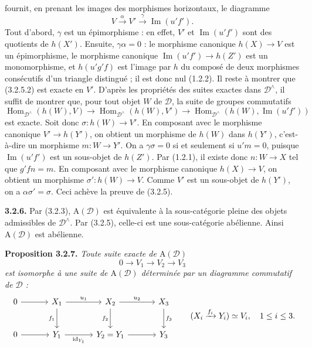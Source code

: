 \clearpage
{}%
\begingroup\small\setlength{\parskip}{0pt}\setlength{\emergencystretch}{1.5em}
fournit, en prenant les images des morphismes horizontaux, le diagramme
\[
V\xrightarrow{\alpha}V'\xrightarrow{\gamma}\operatorname{Im}(u'f').
\tag{3.2.5.2}
\]
Tout d'abord, $\gamma$ est un épimorphisme : en effet, $V'$ et
$\operatorname{Im}(u'f')$ sont des quotients de $h(X')$. Ensuite,
$\gamma\alpha=0$ : le morphisme canonique $h(X)\to V$ est un épimorphisme,
le morphisme canonique $\operatorname{Im}(u'f')\to h(Z')$ est un
monomorphisme, et $h(u'g'f)$ est l'image par $h$ du composé de deux
morphismes consécutifs d'un triangle distingué ; il est donc nul (1.2.2).
Il reste à montrer que (3.2.5.2) est exacte en $V'$. D'après les propriétés
des suites exactes dans $\mathcal D^\wedge$, il suffit de montrer que, pour
tout objet $W$ de $\mathcal D$, la suite de groupes commutatifs
\[
\operatorname{Hom}_{\mathcal D^\wedge}(h(W),V)\longrightarrow
\operatorname{Hom}_{\mathcal D^\wedge}(h(W),V')\longrightarrow
\operatorname{Hom}_{\mathcal D^\wedge}(h(W),\operatorname{Im}(u'f'))
\]
est exacte. Soit donc $\sigma\colon h(W)\to V'$. En composant avec le
morphisme canonique $V'\to h(Y')$, on obtient un morphisme de $h(W)$ dans
$h(Y')$, c'est-à-dire un morphisme $m\colon W\to Y'$. On a
$\gamma\sigma=0$ si et seulement si $u'm=0$, puisque
$\operatorname{Im}(u'f')$ est un sous-objet de $h(Z')$. Par (1.2.1), il
existe donc $n\colon W\to X$ tel que $g'fn=m$. En composant avec le morphisme
canonique $h(X)\to V$, on obtient un morphisme $\sigma'\colon h(W)\to V$.
Comme $V'$ est un sous-objet de $h(Y')$, on a $\alpha\sigma'=\sigma$. Ceci
achève la preuve de (3.2.5).

\medskip\noindent\textbf{3.2.6.}\quad
Par (3.2.3), $\mathrm A(\mathcal D)$ est équivalente à la sous-catégorie
pleine des objets admissibles de $\mathcal D^\wedge$. Par (3.2.5), celle-ci
est une sous-catégorie abélienne. Ainsi $\mathrm A(\mathcal D)$ est abélienne.

\medskip\noindent\textbf{Proposition 3.2.7.}\quad
\textit{Toute suite exacte de $\mathrm A(\mathcal D)$}
\[
0\longrightarrow V_1\longrightarrow V_2\longrightarrow V_3
\]
\textit{est isomorphe à une suite de $\mathrm A(\mathcal D)$ déterminée par
un diagramme commutatif de $\mathcal D$ :}
\[
\begin{tikzcd}[column sep=3.3em,row sep=2.4em]
0\arrow[r]&X_1\arrow[r,"u_1"]\arrow[d,"f_1"']&X_2\arrow[r,"u_2"]\arrow[d,"f_2"']&X_3\arrow[d,"f_3"]\\
0\arrow[r]&Y_1\arrow[r,"\operatorname{id}_{Y_1}"']&Y_2=Y_1\arrow[r]&Y_3
\end{tikzcd}
\qquad
(X_i\xrightarrow{f_i}Y_i)\simeq V_i,\quad1\leq i\leq3.
\]
\endgroup
